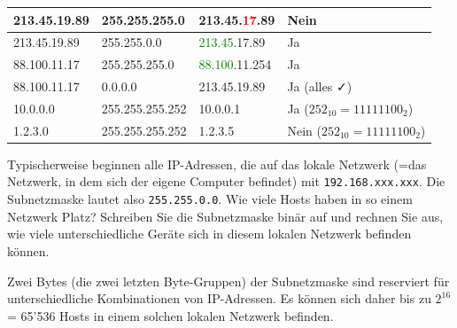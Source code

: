\begin{myexercise}
\begin{myanswer}
\begin{table}[H]
\begin{tabular}{l|l|l|p{2cm}}
				213.45.19.89       & 255.255.255.0      & 213.45.\textcolor{red}{17}.89    & Nein                                \\\midrule

				213.45.19.89       & 255.255.0.0        & \textcolor{green}{213.45}.17.89  & Ja                                  \\\midrule

				88.100.11.17       & 255.255.255.0      & \textcolor{green}{88.100}.11.254 & Ja                                  \\\midrule

				88.100.11.17       & 0.0.0.0            & 213.45.19.89                     & Ja (alles \faCheck)                 \\\midrule

				10.0.0.0           & 255.255.255.252    & 10.0.0.1                         & Ja ($252_{10}=11111100_{2}$)        \\\midrule
				1.2.3.0            & 255.255.255.252    & 1.2.3.5                          & Nein ($252_{10}=11111100_{2}$)
			\end{tabular}
		\end{table}
	\end{myanswer}
\end{myexercise}

\begin{myexercise}
	Typischerweise beginnen alle IP-Adressen, die auf das lokale Netzwerk (=das Netzwerk, in dem sich der eigene Computer befindet) mit \texttt{192.168.xxx.xxx}. Die Subnetzmaske lautet also \texttt{255.255.0.0}. Wie viele Hosts haben in so einem Netzwerk Platz? Schreiben Sie die Subnetzmaske binär auf und rechnen Sie aus, wie viele unterschiedliche Geräte sich in diesem lokalen Netzwerk befinden können.
	\begin{myanswer}
		Zwei Bytes (die zwei letzten Byte-Gruppen) der Subnetzmaske sind reserviert für unterschiedliche Kombinationen von \gls{IP}-Adressen. Es können sich daher bis zu $2^{16}$ = 65'536 Hosts in einem solchen lokalen Netzwerk befinden.
	\end{myanswer}
\end{myexercise}

